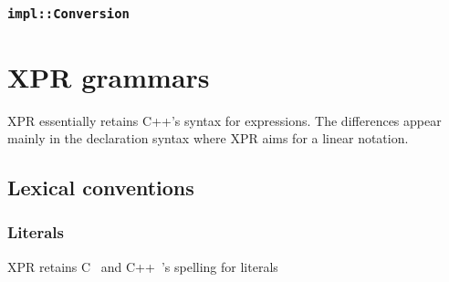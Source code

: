 \documentclass[letter,11pt]{article}
\begin{document}
\subsubsection{\texttt{impl::Conversion}}

\section{XPR grammars}
\label{sec:xpr-grammar}

XPR essentially retains C++'s syntax for expressions.  The differences appear
mainly in the declaration syntax where XPR aims for a linear notation.
\subsection{Lexical conventions}
\label{sec:xpr-grammar:lexical-convention}


\subsubsection{Literals}

XPR retains C~\cite{iso99} and C++~\cite{iso03}'s spelling for literals
\begin{Program}
  
\end{Program}




\end{document}
